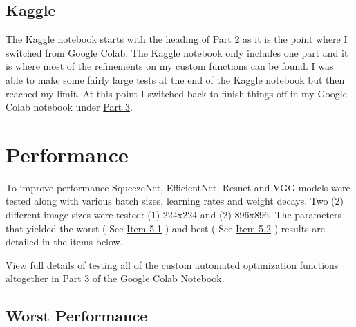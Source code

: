 \documentclass[
  letterpaper,
  DIV=11,
  numbers=noendperiod]{scrartcl}
\begin{document}
\hypertarget{kaggle}{%
\subsection{Kaggle}\label{kaggle}}

The Kaggle notebook starts with the heading of
\href{https://www.kaggle.com/code/brandontoews/fastaiassignment2-part2}{Part
2} as it is the point where I switched from Google Colab. The Kaggle
notebook only includes one part and it is where most of the refinements
on my custom functions can be found. I was able to make some fairly
large tests at the end of the Kaggle notebook but then reached my limit.
At this point I switched back to finish things off in my Google Colab
notebook under
\href{https://colab.research.google.com/drive/1yeosl7vmtW30dD0OBt96jLhi_p4ViRjI\#scrollTo=KaiXfoJTJrKa}{Part
3}.

\hypertarget{performance}{%
\section{Performance}\label{performance}}

To improve performance SqueezeNet, EfficientNet, Resnet and VGG models
were tested along with various batch sizes, learning rates and weight
decays. Two (2) different image sizes were tested: (1) 224x224 and (2)
896x896. The parameters that yielded the worst ( See
\protect\hyperlink{worst-performance}{Item 5.1} ) and best ( See
\protect\hyperlink{best-performance}{Item 5.2} ) results are detailed in
the items below.

\begin{tcolorbox}[enhanced jigsaw, opacityback=0, toprule=.15mm, colbacktitle=quarto-callout-note-color!10!white, opacitybacktitle=0.6, leftrule=.75mm, colback=white, breakable, bottomtitle=1mm, arc=.35mm, toptitle=1mm, left=2mm, colframe=quarto-callout-note-color-frame, titlerule=0mm, coltitle=black, rightrule=.15mm, title=\textcolor{quarto-callout-note-color}{\faInfo}\hspace{0.5em}{Note}, bottomrule=.15mm]

View full details of testing all of the custom automated optimization
functions altogether in
\href{https://colab.research.google.com/drive/1yeosl7vmtW30dD0OBt96jLhi_p4ViRjI\#scrollTo=KaiXfoJTJrKa}{Part
3} of the Google Colab Notebook.

\end{tcolorbox}

\hypertarget{worst-performance}{%
\subsection{Worst Performance}\label{worst-performance}}
\end{document}
